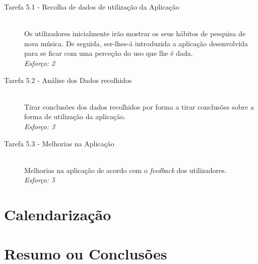     \begin{description}
      \item[Tarefa 5.1 - Recolha de dados de utilização da Aplicação] \hfill \\
      Os utilizadores inicialmente irão mostrar os seus hábitos de pesquisa de nova música.
      De seguida, ser-lhes-á introduzida a aplicação desenvolvida para se ficar com uma perceção do uso que lhe é dada. \\
      \emph{Esforço: 2}

      \item[Tarefa 5.2 - Análise dos Dados recolhidos] \hfill \\
      Tirar conclusões dos dados recolhidos por forma a tirar conclusões sobre a forma de utilização da aplicação. \\
      \emph{Esforço: 3}

      \item[Tarefa 5.3 - Melhorias na Aplicação] \hfill \\
      Melhorias na aplicação de acordo com o \emph{feedback} dos utilizadores. \\
      \emph{Esforço: 5}

    \end{description}



\section{Calendarização} %
\label{sec:calendarizacao}


\section{Resumo ou Conclusões}

